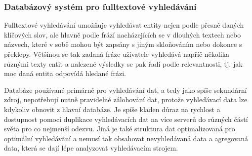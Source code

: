 \begin{itemize}
\begin{itemize}
		\subsubsection{Databázový systém pro fulltextové vyhledávání}

		Fulltextové vyhledávání umožňuje vyhledávat entity nejen podle přesně daných klíčových slov, ale hlavně podle
		frází nacházejících se v dlouhých textech nebo názvech, které v sobě mohou být zapsány s jiným skloňováním nebo
		dokonce s překlepy.
		Většinou se tak zadaná fráze uživatele vyhledává napříč několika různými texty entit a nalezené výsledky se pak
		řadí podle relevantnosti, tj. jak moc daná entita odpovídá hledané frázi.

		Databáze používané primárně pro vyhledávání dat, a tedy jako spíše sekundární zdroj, nepotřebují nutně pravidelné
		zálohování dat, protože vyhledávací data lze kdykoliv obnovit z hlavní databáze.
		Je spíše kladen důraz na rychlost a dostupnost pomocí duplikace vyhledávacích dat na více serverů do různých částí
		světa pro co nejmenší odezvu.
		Jiná je také struktura dat optimalizovaná pro optimální vyhledávání a nemusí tak obsahovat nevyhledávaná data
		a agregovaná data, která se dají lépe analyzovat vyhledávacím strojem.


\end{itemize}
\end{itemize}
